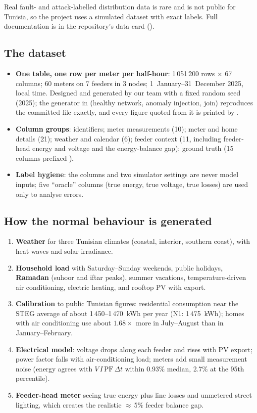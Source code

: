 Real fault- and attack-labelled distribution data is rare and is not public for Tunisia, so the project uses a
simulated dataset with exact labels. Full documentation is in the repository's data card
().

\subsection{The dataset}
\begin{itemize}
  \item \textbf{One table, one row per meter per half-hour}: 1\,051\,200 rows $\times$ 67 columns; 60 meters on
        7 feeders in 3 nodes; 1~January--31~December 2025, local time. Designed and generated by our team with a fixed random
        seed (2025); the generator in  (healthy network, anomaly injection, join) reproduces the
        committed file exactly, and every figure quoted from it is printed by .
  \item \textbf{Column groups}: identifiers; meter measurements (10); meter and home details (21); weather and
        calendar (6); feeder context (11, including feeder-head energy and voltage and the energy-balance gap);
        ground truth (15 columns prefixed ).
  \item \textbf{Label hygiene}: the  columns and two simulator settings are never model inputs; five
        ``oracle'' columns (true energy, true voltage, true losses) are used only to analyse errors.
\end{itemize}

\subsection{How the normal behaviour is generated}
\begin{enumerate}
  \item \textbf{Weather} for three Tunisian climates (coastal, interior, southern coast), with heat waves and
        solar irradiance.
  \item \textbf{Household load} with Saturday--Sunday weekends, public holidays, \textbf{Ramadan} (suhoor and
        iftar peaks), summer vacations, temperature-driven air conditioning, electric heating, and rooftop PV
        with export.
  \item \textbf{Calibration} to public Tunisian figures: residential consumption near the STEG average of about
        1\,450--1\,470~kWh per year (N1: 1\,475~kWh); homes with air conditioning use about $1.68\times$ more in
        July--August than in January--February.
  \item \textbf{Electrical model}: voltage drops along each feeder and rises with PV export; power factor falls
        with air-conditioning load; meters add small measurement noise (energy agrees with
        $V\,I\,\mathrm{PF}\,\Delta t$ within 0.93\% median, 2.7\% at the 95th percentile).
  \item \textbf{Feeder-head meter} seeing true energy plus line losses and unmetered street lighting, which
        creates the realistic $\approx$\,5\% feeder balance gap.
\end{enumerate}

